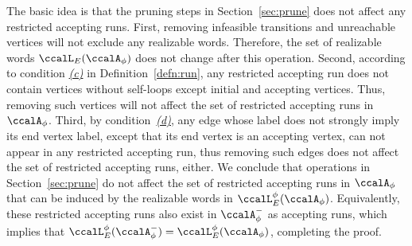 \documentclass[Afour,sageh,times]{sagej}
\newcommand{\autop}{\ccalA_{\phi}}
\begin{document}
{{%

The basic idea is that the pruning steps in Section~\ref{sec:prune} does not affect any restricted accepting runs. First,  removing infeasible transitions and unreachable vertices will not exclude any realizable words. Therefore, the set of realizable words $\ccalL_E(\autop)$ does not change after this operation. Second, according to condition \hyperref[cond:c]{\it (c)} in Definition~\ref{defn:run}, any restricted  accepting run  does not contain vertices without self-loops except  initial and accepting vertices. Thus, removing such vertices  will not affect the  set of restricted accepting runs in $\autop$. Third, by condition~\hyperref[cond:d]{\it (d)}, any edge whose label does not strongly imply its end vertex label, except that its end vertex is an accepting vertex,  can not appear in any restricted accepting run, thus removing such edges does not affect the set of restricted accepting runs, either.  We conclude that operations in Section~\ref{sec:prune}  do not affect the set of restricted accepting runs in $\autop$ that can be induced by the realizable words  in $\ccalL^\phi_E(\autop)$. Equivalently, these restricted accepting runs also exist in $\autop^-$ as accepting runs, which implies that $\ccalL^\phi_E(\autop^-) = \ccalL^\phi_E(\autop)$, completing the proof.


}}
\end{document}
